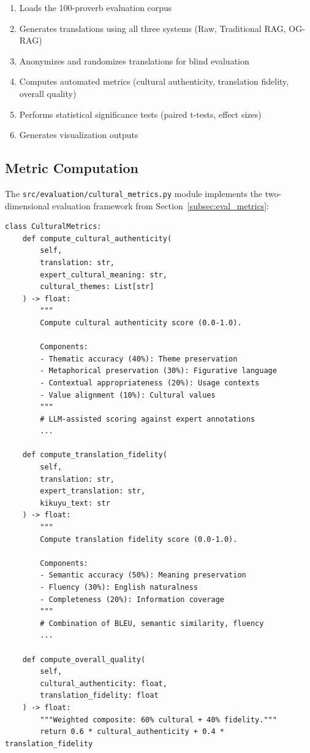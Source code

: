 \begin{enumerate}
    \item Loads the 100-proverb evaluation corpus
    \item Generates translations using all three systems (Raw, Traditional RAG, OG-RAG)
    \item Anonymizes and randomizes translations for blind evaluation
    \item Computes automated metrics (cultural authenticity, translation fidelity, overall quality)
    \item Performs statistical significance tests (paired t-tests, effect sizes)
    \item Generates visualization outputs
\end{enumerate}

\subsection{Metric Computation}
\label{subsec:metric_computation}

The \texttt{src/evaluation/cultural\_metrics.py} module implements the two-dimensional evaluation framework from Section~\ref{subsec:eval_metrics}:

\begin{verbatim}
class CulturalMetrics:
    def compute_cultural_authenticity(
        self, 
        translation: str,
        expert_cultural_meaning: str,
        cultural_themes: List[str]
    ) -> float:
        """
        Compute cultural authenticity score (0.0-1.0).
        
        Components:
        - Thematic accuracy (40%): Theme preservation
        - Metaphorical preservation (30%): Figurative language
        - Contextual appropriateness (20%): Usage contexts
        - Value alignment (10%): Cultural values
        """
        # LLM-assisted scoring against expert annotations
        ...
    
    def compute_translation_fidelity(
        self,
        translation: str,
        expert_translation: str,
        kikuyu_text: str
    ) -> float:
        """
        Compute translation fidelity score (0.0-1.0).
        
        Components:
        - Semantic accuracy (50%): Meaning preservation
        - Fluency (30%): English naturalness
        - Completeness (20%): Information coverage
        """
        # Combination of BLEU, semantic similarity, fluency
        ...
    
    def compute_overall_quality(
        self,
        cultural_authenticity: float,
        translation_fidelity: float
    ) -> float:
        """Weighted composite: 60% cultural + 40% fidelity."""
        return 0.6 * cultural_authenticity + 0.4 * translation_fidelity
\end{verbatim}


